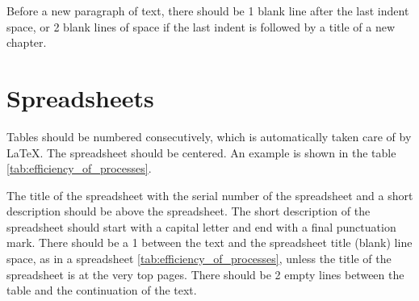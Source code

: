 Before a new paragraph of text, there should be 1 blank line after the last indent
space, or 2 blank lines of space if the last indent is followed by a title
of a new chapter.

\section{Spreadsheets}\label{sec:spreadsheets}

Tables should be numbered consecutively, which is automatically taken care of by \LaTeX.
The spreadsheet should be centered. An example is shown in the table
\ref{tab:efficiency_of_processes}.

The title of the spreadsheet with the serial number of the spreadsheet and a short description should be
above the spreadsheet. The short description of the spreadsheet should start with a capital letter and
end with a final punctuation mark. There should be a 1 between the text and the spreadsheet title
(blank) line space, as in a spreadsheet
\ref{tab:efficiency_of_processes}, unless the title of the spreadsheet is at the very top
pages. There should be 2 empty lines between the table and the continuation of the text.

